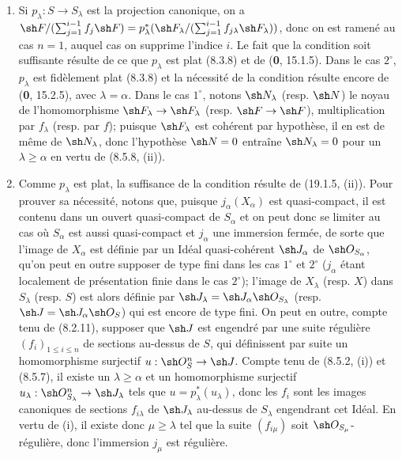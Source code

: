 \begin{enumerate}
  \item[(i)] Si $p_\lambda:S\to S_\lambda$ est la projection canonique, on a $\sh F/(\sum_{j=1}^{i-1}f_j\sh F)=p_\lambda^*(\sh F_\lambda/(\sum_{j=1}^{i-1}f_{j\lambda}\sh F_\lambda))$, donc on est ramené au cas $n=1$, auquel cas on supprime l'indice $i$. Le fait que la condition soit suffisante résulte de ce que $p_\lambda$ est plat (8.3.8) et de (\textbf{0}, 15.1.5). Dans le cas $2^\circ$, $p_\lambda$ est fidèlement plat (8.3.8) et la nécessité de la condition résulte encore de (\textbf{0}, 15.2.5), avec $\lambda=\alpha$. Dans le cas $1^\circ$, notons $\sh N_\lambda$ (resp. $\sh N$) le noyau de l'homomorphisme $\sh F_\lambda\to\sh F_\lambda$ (resp. $\sh F\to\sh F$), multiplication par $f_\lambda$ (resp. par $f$); puisque $\sh F_\lambda$ est cohérent par hypothèse, il en est de même de $\sh N_\lambda$, donc l'hypothèse $\sh N=0$ entraîne $\sh N_\lambda=0$ pour un $\lambda\geq\alpha$ en vertu de (8.5.8, (ii)).
  \item[(ii)] Comme $p_\lambda$ est plat, la suffisance de la condition résulte de (19.1.5, (ii)). Pour prouver sa nécessité, notons que, puisque $j_\alpha(X_\alpha)$ est quasi-compact, il est contenu dans un ouvert quasi-compact de $S_\alpha$ et on peut donc se limiter au cas où $S_\alpha$ est aussi quasi-compact et $j_\alpha$ une immersion fermée, de sorte que l'image de $X_\alpha$ est définie par un Idéal quasi-cohérent $\sh J_\alpha$ de $\sh O_{S_\alpha}$, qu'on peut en outre supposer de type fini dans les cas $1^\circ$ et $2^\circ$ ($j_\alpha$ étant localement de présentation finie dans le cas $2^\circ$); l'image de $X_\lambda$ (resp. $X$) dans $S_\lambda$ (resp. $S$) est alors définie par $\sh J_\lambda=\sh J_\alpha\sh O_{S_\lambda}$ (resp. $\sh J=\sh J_\alpha\sh O_S$) qui est encore de type fini. On peut en outre, compte tenu de (8.2.11), supposer que $\sh J$ est engendré par une suite régulière $(f_i)_{1\leq i\leq n}$ de sections au-dessus de $S$, qui définissent par suite un homomorphisme surjectif $u:\sh O_S^n\to\sh J$. Compte tenu de (8.5.2, (i)) et (8.5.7), il existe un $\lambda\geq\alpha$ et un homomorphisme surjectif $u_\lambda:\sh O_{S_\lambda}^n\to\sh J_\lambda$ tels que $u=p_\lambda^*(u_\lambda)$, donc les $f_i$ sont les images canoniques de sections $f_{i\lambda}$ de $\sh J_\lambda$ au-dessus de $S_\lambda$ engendrant cet Idéal. En vertu de (i), il existe donc $\mu\geq\lambda$ tel que la suite $(f_{i\mu})$ soit $\sh O_{S_\mu}$-régulière, donc l'immersion $j_\mu$ est régulière.
\end{enumerate}

